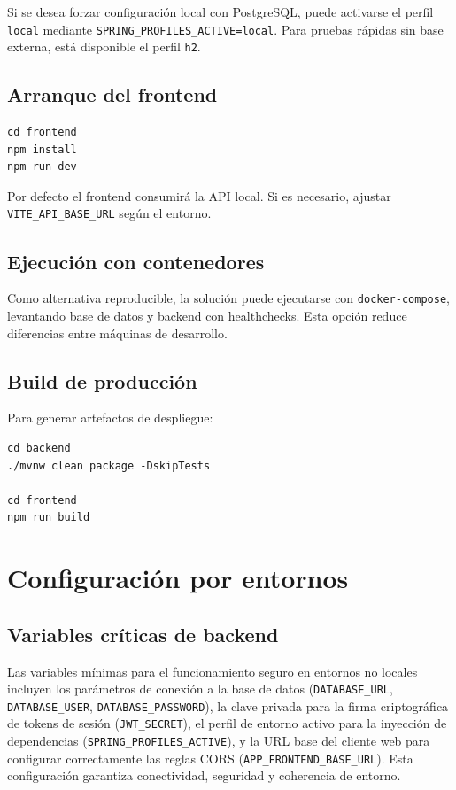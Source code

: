 Si se desea forzar configuraci\'on local con PostgreSQL,
puede activarse el perfil \texttt{local} mediante
\texttt{SPRING\_PROFILES\_ACTIVE=local}. Para pruebas r\'apidas
sin base externa, est\'a disponible el perfil \texttt{h2}.

\section{Arranque del frontend}

\begin{verbatim}
cd frontend
npm install
npm run dev
\end{verbatim}

Por defecto el frontend consumir\'a la API local. Si es necesario,
ajustar \texttt{VITE\_API\_BASE\_URL} seg\'un el entorno.

\section{Ejecuci\'on con contenedores}

Como alternativa reproducible, la soluci\'on puede ejecutarse con
\texttt{docker-compose}, levantando base de datos y backend con healthchecks.
Esta opci\'on reduce diferencias entre m\'aquinas de desarrollo.

\section{Build de producci\'on}

Para generar artefactos de despliegue:

\begin{verbatim}
cd backend
./mvnw clean package -DskipTests

cd frontend
npm run build
\end{verbatim}

\FloatBarrier
\chapter{Configuraci\'on por entornos}\label{apendice-configuracion}

\section{Variables cr\'iticas de backend}

Las variables m\'inimas para el funcionamiento seguro en entornos no locales incluyen los par\'ametros de conexi\'on a la base de datos (\texttt{DATABASE\_URL}, \texttt{DATABASE\_USER}, \texttt{DATABASE\_PASSWORD}), la clave privada para la firma criptogr\'afica de tokens de sesi\'on (\texttt{JWT\_SECRET}), el perfil de entorno activo para la inyecci\'on de dependencias (\texttt{SPRING\_PROFILES\_ACTIVE}), y la URL base del cliente web para configurar correctamente las reglas CORS (\texttt{APP\_FRONTEND\_BASE\_URL}). Esta configuraci\'on garantiza conectividad, seguridad y coherencia de entorno.

